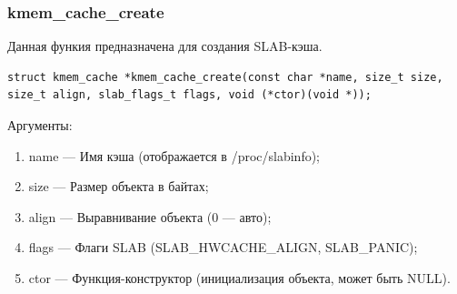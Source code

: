 %
%
%
%

%

\subsubsection*{kmem\_cache\_create}

Данная функия предназначена для создания SLAB-кэша.

\begin{lstlisting}
struct kmem_cache *kmem_cache_create(const char *name, size_t size, size_t align, slab_flags_t flags, void (*ctor)(void *));
\end{lstlisting}

Аргументы:
\begin{enumerate}
    \item name --- Имя кэша (отображается в /proc/slabinfo);
    \item size --- Размер объекта в байтах;
    \item align	--- Выравнивание объекта (0 --- авто);
    \item flags	--- Флаги SLAB (SLAB\_HWCACHE\_ALIGN, SLAB\_PANIC);
    \item ctor --- Функция-конструктор (инициализация объекта, может быть NULL).
\end{enumerate}

